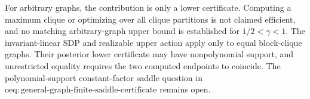 For arbitrary graphs, the contribution is only a lower certificate.  Computing a maximum clique or optimizing over all clique partitions is not claimed efficient, and no matching arbitrary-graph upper bound is established for \(1/2<\gamma<1\).  The invariant-linear SDP and realizable upper action apply only to equal block-clique graphs.  Their posterior lower certificate may have nonpolynomial support, and unrestricted equality requires the two computed endpoints to coincide.  The polynomial-support constant-factor saddle question in \(\mathrm{oeq{:}general\text{-}graph\text{-}finite\text{-}saddle\text{-}certificate}\) remains open.